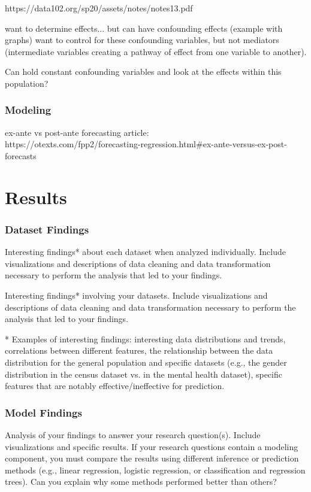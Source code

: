 \documentclass[11pt]{article}
\begin{document}
https://data102.org/sp20/assets/notes/notes13.pdf

want to determine effects... 
but can have confounding effects (example with graphs) 
want to control for these confounding variables, but not mediators (intermediate variables creating a pathway of effect from one variable to another). 

Can hold constant confounding variables and look at the effects within this population? 


\subsubsection{Modeling}

ex-ante vs post-ante forecasting article:\\
https://otexts.com/fpp2/forecasting-regression.html\#ex-ante-versus-ex-post-forecasts


\section{Results}

\subsubsection{Dataset Findings}
 Interesting findings* about each dataset when analyzed individually. Include visualizations and descriptions of data cleaning and data transformation necessary to perform the analysis that led to your findings.
 
 Interesting findings* involving your datasets. Include visualizations and descriptions of data cleaning and data transformation necessary to perform the analysis that led to your findings. 
 
 
* Examples of interesting findings: interesting data distributions and trends, correlations between different features, the relationship between the data distribution for the general population and specific datasets (e.g., the gender distribution in the census dataset vs. in the mental health dataset), specific features that are notably effective/ineffective for prediction.
 
\subsubsection{Model Findings}
Analysis of your findings to answer your research question(s). Include visualizations and specific results. If your research questions contain a modeling component, you must compare the results using different inference or prediction methods (e.g., linear regression, logistic regression, or classification and regression trees). Can you explain why some methods performed better than others?
\end{document}
